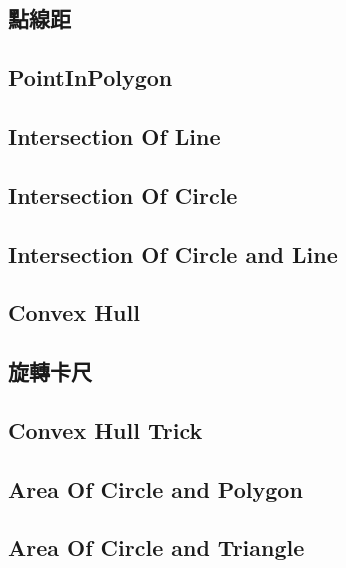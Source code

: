 \documentclass[a4paper,10pt,twocolumn,oneside]{article}
\newcommand{\inputcpp}[1]{}  %
\begin{document}
\subsection{點線距}
\inputcpp{geometry/PointToSegmentDistance.cpp}

\subsection{PointInPolygon}
\inputcpp{geometry/PointInPolygon.cpp}

\subsection{Intersection Of Line}
\inputcpp{geometry/IntersectionOfLine.cpp}

\subsection{Intersection Of Circle}
\inputcpp{geometry/IntersectionOfCircle.cpp}

\subsection{Intersection Of Circle and Line}
\inputcpp{geometry/IntersectionOfCircleLine.cpp}

\subsection{Convex Hull}
\inputcpp{geometry/ConvexHull.cpp}

\subsection{旋轉卡尺}
\inputcpp{geometry/RotatingCalipers.cpp}

\subsection{Convex Hull Trick}
\inputcpp{geometry/ConvexHullTrick.cpp}

\subsection{Area Of Circle and Polygon}
\inputcpp{geometry/AreaOfCirclePolygon.cpp}

\subsection{Area Of Circle and Triangle}
\inputcpp{geometry/AreaOfCircleTriangle.cpp}
\end{document}
